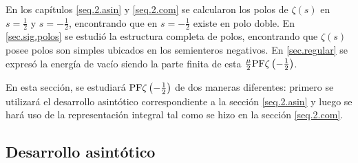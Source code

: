 En los capítulos \ref{seq.2.asin} y \ref{seq.2.com} se calcularon los polos de \mbox{$\zeta (s)$} en $s= \frac{1}{2}$ y $s=-\frac{1}{2}$, encontrando que en $s=- \frac{1}{2}$ existe en polo doble. En \ref{sec.sig.polos} se estudió la estructura completa de polos, encontrando que $\zeta (s)$ posee polos son simples ubicados en los semienteros negativos. En \ref{sec.regular} se expresó la energía de vacío siendo la parte finita de esta $\frac{\mu}{2} {\rm PF } \zeta \left( - \frac{1}{2} \right)$.

En esta sección, se estudiará ${\rm PF } \zeta \left( - \frac{1}{2} \right)$ de dos maneras diferentes: primero se utilizará el desarrollo asintótico correspondiente a la sección \ref{seq.2.asin} y luego se hará uso de la representación integral tal como se hizo en la sección \ref{seq.2.com}.

\subsection{Desarrollo asintótico}\label{seq.desarrollo.asintotico}

